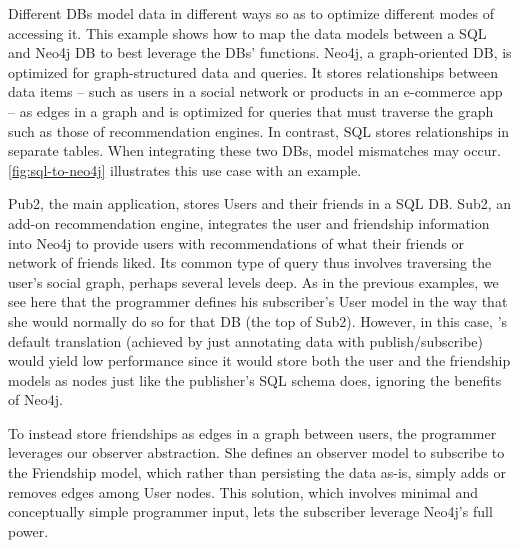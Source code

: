 Different DBs model data in different ways so as to optimize different modes of
accessing it. This example shows how to map the data models between a SQL and
Neo4j DB to best leverage the DBs' functions.  Neo4j, a graph-oriented DB, is
optimized for graph-structured data and queries. It stores relationships between
data items -- such as users in a social network or products in an e-commerce app
-- as edges in a graph and is optimized for queries that must traverse the graph
such as those of recommendation engines. In contrast, SQL stores relationships
in separate tables. When integrating these two DBs, model mismatches may occur.
\F\ref{fig:sql-to-neo4j} illustrates this use case with an example.

Pub2, the main application, stores Users and their friends in a SQL DB.
Sub2, an add-on recommendation engine, integrates the user and friendship
information into Neo4j to provide users with recommendations of what their
friends or network of friends liked. Its common type of query thus involves
traversing the user's social graph, perhaps several levels deep.  As in the
previous examples, we see here that the programmer defines his subscriber's User
model in the way that she would normally do so for that DB (the top of
Sub2).  However, in this case, \synapse's default translation (achieved by just
annotating data with publish/subscribe) would yield low performance since it
would store both the user and the friendship models as nodes just like the
publisher's SQL schema does, ignoring the benefits of Neo4j.

To instead store friendships as edges in a graph between users, the programmer
leverages our observer abstraction.  She defines an observer model to
subscribe to the Friendship model, which rather than persisting the data as-is,
simply adds or removes edges among User nodes.  This solution, which involves
minimal and conceptually simple programmer input, lets the subscriber
leverage Neo4j's full power.

